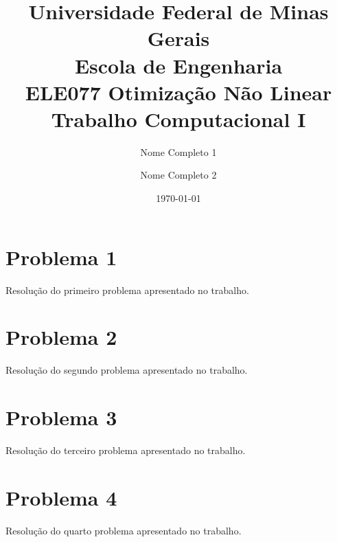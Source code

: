 \documentclass[12pt,a4paper]{article}
\title{{\footnotesize Universidade Federal de Minas Gerais\\Escola de Engenharia\\ELE077 Otimização Não Linear\\} \vspace{5mm} Trabalho Computacional I}
\author{Nome Completo 1 \and Nome Completo 2}
\date{\today}
\begin{document}
\maketitle

\section{Problema 1}

Resolução do primeiro problema apresentado no trabalho.

\section{Problema 2}

Resolução do segundo problema apresentado no trabalho.

\section{Problema 3}

Resolução do terceiro problema apresentado no trabalho.

\section{Problema 4}

Resolução do quarto problema apresentado no trabalho.
\end{document}

